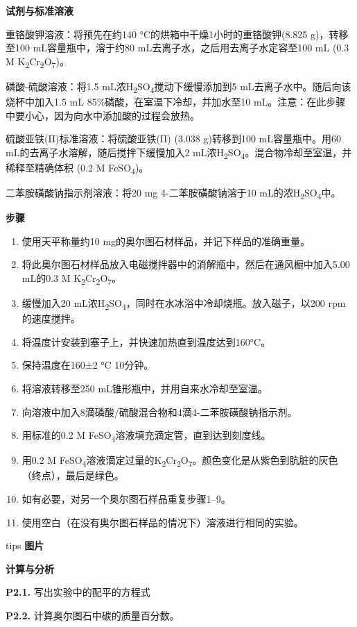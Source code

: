 \textbf{试剂与标准溶液}

重铬酸钾溶液：将预先在约140 °C的烘箱中干燥1小时的重铬酸钾(8.825
g)，转移至100 mL容量瓶中，溶于约80 mL去离子水，之后用去离子水定容至100
mL (0.3 M K\textsubscript{2}Cr\textsubscript{2}O\textsubscript{7})。

磷酸-硫酸溶液：将1.5
mL浓H\textsubscript{2}SO\textsubscript{4}搅动下缓慢添加到5
mL去离子水中。随后向该烧杯中加入1.5 mL
85\%磷酸，在室温下冷却，并加水至10
mL。注意：在此步骤中要小心，因为向水中添加酸的过程会放热。

硫酸亚铁(II)标准溶液：将硫酸亚铁(II) (3.038 g)转移到100 mL容量瓶中。用60
mL的去离子水溶解，随后搅拌下缓慢加入2
mL浓H\textsubscript{2}SO\textsubscript{4}。混合物冷却至室温，并稀释至精确体积
(0.2 M FeSO\textsubscript{4})。

二苯胺磺酸钠指示剂溶液：将20 mg 4-二苯胺磺酸钠溶于10
mL的浓H\textsubscript{2}SO\textsubscript{4}中。

\textbf{步骤}

\begin{enumerate}
\tightlist
\item
  使用天平称量约10 mg的奥尔图石材样品，并记下样品的准确重量。
\item
  将此奥尔图石材样品放入电磁搅拌器中的消解瓶中，然后在通风橱中加入5.00
  mL的0.3 M K\textsubscript{2}Cr\textsubscript{2}O\textsubscript{7}。
\item
  缓慢加入20
  mL浓H\textsubscript{2}SO\textsubscript{4}，同时在水冰浴中冷却烧瓶。放入磁子，以200
  rpm的速度搅拌。
\item
  将温度计安装到塞子上，并快速加热直到温度达到160°C。
\item
  保持温度在160±2 °C 10分钟。
\item
  将溶液转移至250 mL锥形瓶中，并用自来水冷却至室温。
\item
  向溶液中加入8滴磷酸/硫酸混合物和4滴4-二苯胺磺酸钠指示剂。
\item
  用标准的0.2 M FeSO\textsubscript{4}溶液填充滴定管，直到达到刻度线。
\item
  用0.2 M
  FeSO\textsubscript{4}溶液滴定过量的K\textsubscript{2}Cr\textsubscript{2}O\textsubscript{7}。颜色变化是从紫色到肮脏的灰色（终点），最后是绿色。
\item
  如有必要，对另一个奥尔图石样品重复步骤1--9。
\item
  使用空白（在没有奥尔图石样品的情况下）溶液进行相同的实验。
\end{enumerate}

tips \textbf{图片}

\textbf{计算与分析}

\noindent\textbf{P2.1.} 写出实验中的配平的方程式

\noindent\textbf{P2.2.} 计算奥尔图石中碳的质量百分数。

